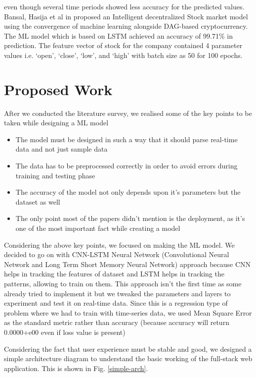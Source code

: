 \documentclass[conference]{IEEEtran}
\begin{document}
even though several time periods showed less accuracy for the predicted values. Bansal, Hasija et al in \cite{b9} proposed an Intelligent decentralized Stock market model using the convergence of machine learning alongside DAG-based cryptocurrency. The ML model which is based on LSTM achieved an accuracy of 99.71\%  in prediction. The feature vector of stock for the company contained 4 parameter values i.e. ‘open’, ‘close’, ‘low’, and ‘high’ with batch size as 50 for 100 epochs.  


\section{Proposed Work}
After we conducted the literature survey, we realised some of the key points to be taken while designing a ML model
\begin{itemize}
\item The model must be designed in such a way that it should parse real-time data and not just sample data
\item The data has to be preprocessed correctly in order to avoid errors during training and testing phase
\item The accuracy of the model not only depends upon it's parameters but the dataset as well
\item The only point most of the papers didn't mention is the deployment, as it's one of the most important fact while creating a model
\end{itemize}
Considering the above key points, we focused on making the ML model. We decided to go on with CNN-LSTM Neural Network (Convolutional Neural Network and Long Term Short Memory Neural Network) approach because CNN helps in tracking the features of dataset and LSTM helps in tracking the patterns, allowing to train on them. This approach isn't the first time as some already tried to implement it but we tweaked the parameters and layers to experiment and test it on real-time data. Since this is a regression type of problem where we had to train with time-series data, we used Mean Square Error as the standard metric rather than accuracy (because accuracy will return 0.0000+e00 even if loss value is present)

Considering the fact that user experience must be stable and good, we designed a simple architecture diagram to understand the basic working of the full-stack web application. This is shown in Fig. \ref{simple-arch}.
\end{document}

